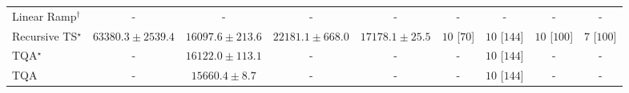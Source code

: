 \begin{tabular}{l|cccc|cccc|}
Linear Ramp$^\dagger$ & {\cellcolor[HTML]{000000}} \color[HTML]{F1F1F1} {\cellcolor{white}} \color{black} - & {\cellcolor[HTML]{000000}} \color[HTML]{F1F1F1} {\cellcolor{white}} \color{black} - & {\cellcolor[HTML]{000000}} \color[HTML]{F1F1F1} {\cellcolor{white}} \color{black} - & {\cellcolor[HTML]{000000}} \color[HTML]{F1F1F1} {\cellcolor{white}} \color{black} - & {\cellcolor[HTML]{000000}} \color[HTML]{F1F1F1} {\cellcolor{white}} \color{black} - & {\cellcolor[HTML]{000000}} \color[HTML]{F1F1F1} {\cellcolor{white}} \color{black} - & {\cellcolor[HTML]{000000}} \color[HTML]{F1F1F1} {\cellcolor{white}} \color{black} - & {\cellcolor[HTML]{000000}} \color[HTML]{F1F1F1} {\cellcolor{white}} \color{black} - \\
Recursive TS$^\star$ & {\cellcolor[HTML]{943304}} \color[HTML]{F1F1F1} $63380.3\pm 2539.4$ & {\cellcolor[HTML]{FED16B}} \color[HTML]{000000} $16097.6\pm 213.6$ & {\cellcolor[HTML]{FEBD49}} \color[HTML]{000000} $22181.1\pm 668.0$ & {\cellcolor[HTML]{FECD63}} \color[HTML]{000000} $17178.1\pm 25.5$ & {\cellcolor[HTML]{49006A}} \color[HTML]{F1F1F1} $10$ [$70$] & {\cellcolor[HTML]{49006A}} \color[HTML]{F1F1F1} $10$ [$144$] & {\cellcolor[HTML]{49006A}} \color[HTML]{F1F1F1} $10$ [$100$] & {\cellcolor[HTML]{CD238F}} \color[HTML]{F1F1F1} $7$ [$100$] \\
TQA$^\star$ & {\cellcolor[HTML]{000000}} \color[HTML]{F1F1F1} {\cellcolor{white}} \color{black} - & {\cellcolor[HTML]{FED16B}} \color[HTML]{000000} $16122.0\pm 113.1$ & {\cellcolor[HTML]{000000}} \color[HTML]{F1F1F1} {\cellcolor{white}} \color{black} - & {\cellcolor[HTML]{000000}} \color[HTML]{F1F1F1} {\cellcolor{white}} \color{black} - & {\cellcolor[HTML]{000000}} \color[HTML]{F1F1F1} {\cellcolor{white}} \color{black} - & {\cellcolor[HTML]{49006A}} \color[HTML]{F1F1F1} $10$ [$144$] & {\cellcolor[HTML]{000000}} \color[HTML]{F1F1F1} {\cellcolor{white}} \color{black} - & {\cellcolor[HTML]{000000}} \color[HTML]{F1F1F1} {\cellcolor{white}} \color{black} - \\
TQA & {\cellcolor[HTML]{000000}} \color[HTML]{F1F1F1} {\cellcolor{white}} \color{black} - & {\cellcolor[HTML]{FED26D}} \color[HTML]{000000} $15660.4\pm 8.7$ & {\cellcolor[HTML]{000000}} \color[HTML]{F1F1F1} {\cellcolor{white}} \color{black} - & {\cellcolor[HTML]{000000}} \color[HTML]{F1F1F1} {\cellcolor{white}} \color{black} - & {\cellcolor[HTML]{000000}} \color[HTML]{F1F1F1} {\cellcolor{white}} \color{black} - & {\cellcolor[HTML]{49006A}} \color[HTML]{F1F1F1} $10$ [$144$] & {\cellcolor[HTML]{000000}} \color[HTML]{F1F1F1} {\cellcolor{white}} \color{black} - & {\cellcolor[HTML]{000000}} \color[HTML]{F1F1F1} {\cellcolor{white}} \color{black} - \\

\end{tabular}
